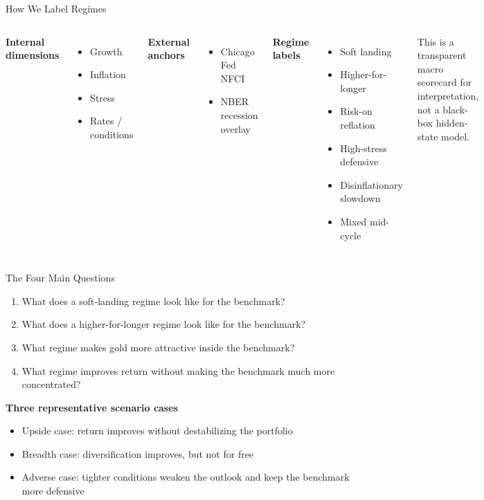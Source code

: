 \documentclass[aspectratio=169,11pt]{beamer}
\begin{document}
\begin{frame}{How We Label Regimes}
\begin{columns}[T,totalwidth=\textwidth]
\textbf{Internal dimensions}
\begin{itemize}
  \item Growth
  \item Inflation
  \item Stress
  \item Rates / conditions
\end{itemize}

\vspace{0.5em}
\textbf{External anchors}
\begin{itemize}
  \item Chicago Fed NFCI
  \item NBER recession overlay
\end{itemize}

\textbf{Regime labels}
\begin{itemize}
  \item Soft landing
  \item Higher-for-longer
  \item Risk-on reflation
  \item High-stress defensive
  \item Disinflationary slowdown
  \item Mixed mid-cycle
\end{itemize}
\vspace{0.7em}
{\small\color{muted}This is a transparent macro scorecard for interpretation, not a black-box hidden-state model.}
\end{columns}
\end{frame}

\begin{frame}{The Four Main Questions}
\begin{enumerate}
  \item What does a soft-landing regime look like for the benchmark?
  \item What does a higher-for-longer regime look like for the benchmark?
  \item What regime makes gold more attractive inside the benchmark?
  \item What regime improves return without making the benchmark much more concentrated?
\end{enumerate}
\vspace{1em}
\textbf{Three representative scenario cases}
\begin{itemize}
  \item Upside case: return improves without destabilizing the portfolio
  \item Breadth case: diversification improves, but not for free
  \item Adverse case: tighter conditions weaken the outlook and keep the benchmark more defensive
\end{itemize}
\end{frame}
\end{document}
